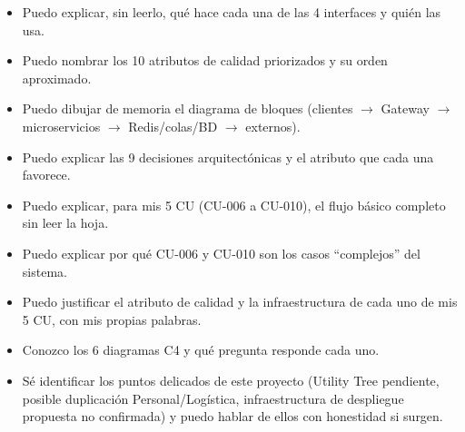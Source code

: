 \documentclass[12pt,a4paper]{article}
\begin{document}
\begin{itemize}[itemsep=2pt]
\item[$\square$] Puedo explicar, sin leerlo, qué hace cada una de las 4 interfaces y quién las usa.
\item[$\square$] Puedo nombrar los 10 atributos de calidad priorizados y su orden aproximado.
\item[$\square$] Puedo dibujar de memoria el diagrama de bloques (clientes $\to$ Gateway $\to$
microservicios $\to$ Redis/colas/BD $\to$ externos).
\item[$\square$] Puedo explicar las 9 decisiones arquitectónicas y el atributo que cada una
favorece.
\item[$\square$] Puedo explicar, para mis 5 CU (CU-006 a CU-010), el flujo básico completo sin leer
la hoja.
\item[$\square$] Puedo explicar por qué CU-006 y CU-010 son los casos ``complejos'' del sistema.
\item[$\square$] Puedo justificar el atributo de calidad y la infraestructura de cada uno de mis 5
CU, con mis propias palabras.
\item[$\square$] Conozco los 6 diagramas C4 y qué pregunta responde cada uno.
\item[$\square$] Sé identificar los puntos delicados de este proyecto (Utility Tree pendiente,
posible duplicación Personal/Logística, infraestructura de despliegue propuesta no confirmada) y
puedo hablar de ellos con honestidad si surgen.
\end{itemize}
\end{document}
